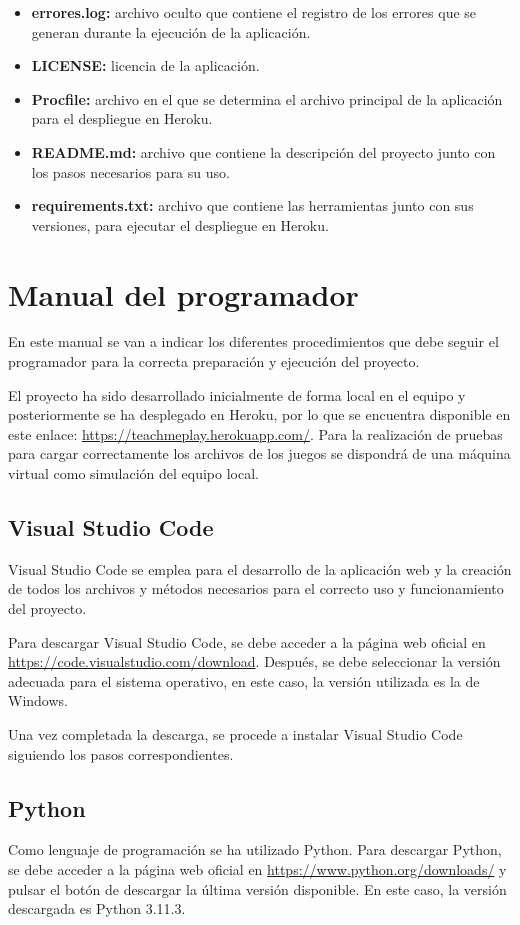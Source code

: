 \begin{itemize}
    \item \textbf{errores.log:} archivo oculto que contiene el registro de los errores que se generan durante la ejecución de la aplicación.
    \item \textbf{LICENSE:} licencia de la aplicación.
    \item \textbf{Procfile:} archivo en el que se determina el archivo principal de la aplicación para el despliegue en Heroku. 
    \item \textbf{README.md:} archivo que contiene la descripción del proyecto junto con los pasos necesarios para su uso.
    \item \textbf{requirements.txt:} archivo que contiene las herramientas junto con sus versiones, para ejecutar el despliegue en Heroku.
   
\end{itemize}

\section{Manual del programador}
En este manual se van a indicar los diferentes procedimientos que debe seguir el programador para la correcta preparación y ejecución del proyecto.

El proyecto ha sido desarrollado inicialmente de forma local en el equipo y posteriormente se ha desplegado en Heroku, por lo que se encuentra disponible en este enlace: \url {https://teachmeplay.herokuapp.com/}. Para la realización de pruebas para cargar correctamente los archivos de los juegos se dispondrá de una máquina virtual como simulación del equipo local.

\subsection{Visual Studio Code}
Visual Studio Code se emplea para el desarrollo de la aplicación web y la creación de todos los archivos y métodos necesarios para el correcto uso y funcionamiento del proyecto.

Para descargar Visual Studio Code, se debe acceder a la página web oficial en \url{https://code.visualstudio.com/download}. Después, se debe seleccionar la versión adecuada para el sistema operativo, en este caso, la versión utilizada es la de Windows.

Una vez completada la descarga, se procede a instalar Visual Studio Code siguiendo los pasos correspondientes.

\subsection{Python}
Como lenguaje de programación se ha utilizado Python. Para descargar Python, se debe acceder a la página web oficial en \url{https://www.python.org/downloads/} y pulsar el botón de descargar la última versión disponible. En este caso, la versión descargada es Python 3.11.3.

